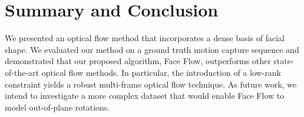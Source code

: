 \section{Summary and Conclusion}\label{sec:conclusion}
We presented an optical flow method that incorporates a dense
basis of facial shape. We evaluated our method on a ground truth motion capture
sequence and demonstrated that our proposed algorithm, Face Flow, outperforms
other state-of-the-art optical flow methods. In particular, the introduction
of a low-rank constraint yields a robust multi-frame optical flow technique.
As future work, we intend to investigate a more complex dataset that would enable
Face Flow to model out-of-plane rotations.
